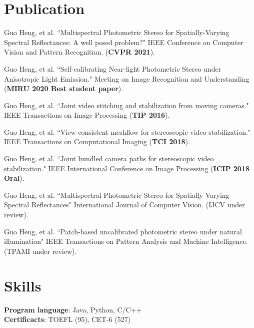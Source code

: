 \documentclass[letterpaper,11pt]{article}
\begin{document}
\section{Publication}
\begin{enumerate}[label={[\arabic*]}]
	\item Guo Heng, et al. ``Multispectral Photometric Stereo for Spatially-Varying Spectral Reflectances: A well posed problem?" IEEE Conference on Computer Vision and Pattern Recognition. (\textbf{CVPR 2021}). 
	\item Guo Heng, et al. ``Self-calibrating Near-light Photometric Stereo under Anisotropic Light Emission." Meeting on Image Recognition and Understanding (\textbf{MIRU 2020 Best student paper}).  
	\item Guo Heng, et al. ``Joint video stitching and stabilization from moving cameras." IEEE Transactions on Image Processing (\textbf{TIP 2016}).
	\item Guo Heng, et al. ``View-consistent meshflow for stereoscopic video stabilization." IEEE Transactions on Computational Imaging (\textbf{TCI 2018}).
	\item Guo Heng, et al. ``Joint bundled camera paths for stereoscopic video stabilization." IEEE International Conference on Image Processing (\textbf{ICIP 2018 Oral}).
	\item Guo Heng, et al. ``Multispectral Photometric Stereo for Spatially-Varying Spectral Reflectances" International Journal of Computer Vision. (IJCV under review). 
	\item Guo Heng, et al. ``Patch-based uncalibrated photometric stereo under natural illumination" 
	IEEE Transactions on Pattern Analysis and Machine Intelligence. (TPAMI under review). 
\end{enumerate}

%
\section{Skills}
 \begin{itemize}[leftmargin=0.15in, label={}]
    \small{\item{
     \textbf{Program language}{: Java, Python, C/C++} \\
     \textbf{Certificacts}{: TOEFL (95), CET-6 (527)} \\
    }}
 \end{itemize}


\end{document}
